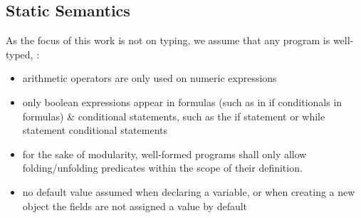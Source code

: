 \documentclass {llncs}
\begin{document}

\subsection{Static Semantics}
As the focus of this work is not on typing, we assume that any program is well-typed, \eg:

\begin{itemize}
\item arithmetic operators are only used on numeric expressions
\item only boolean expressions appear in formulas (such as in if conditionals in formulas) \& conditional statements, such as the if statement or while statement conditional statements
\item for the sake of modularity, well-formed programs shall only allow folding/unfolding predicates within the scope of their definition.
\item no default value assumed when declaring a variable, or when creating a new object the fields are not assigned a value by default
\end{itemize}

\end{document}
